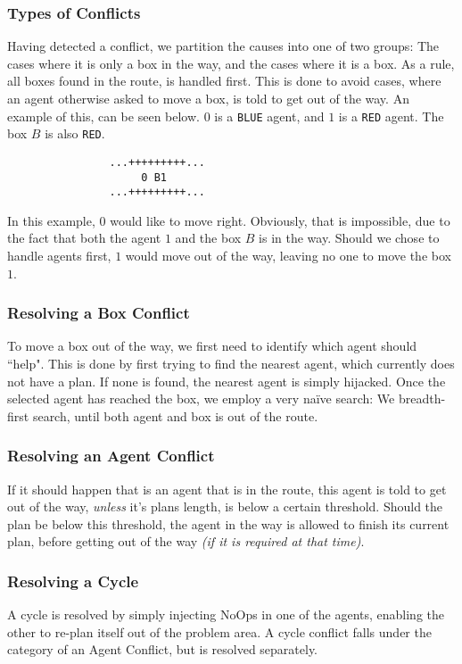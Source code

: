 \documentclass[letterpaper]{article}
\begin{document}
		\subsubsection{Types of Conflicts}
			Having detected a conflict, we partition the causes into one of two groups: The cases where it is only a box in the way, and the cases where it is a box. As a rule, all boxes found in the route, is handled first. This is done to avoid cases, where an agent otherwise asked to move a box, is told to get out of the way. An example of this, can be seen below. $0$ is a \verb=BLUE= agent, and $1$ is a \verb=RED= agent. The box $B$ is also \verb=RED=. 
			\begin{verbatim}
				...+++++++++...
				     0 B1
				...+++++++++...
			\end{verbatim}
			In this example, $0$ would like to move right. Obviously, that is impossible, due to the fact that both the agent $1$ and the box $B$ is in the way. Should we chose to handle agents first, $1$ would move out of the way, leaving no one to move the box $1$.

		\subsubsection{Resolving a Box Conflict}
			To move a box out of the way, we first need to identify which agent should ``help". This is done by first trying to find the nearest agent, which currently does not have a plan. If none is found, the nearest agent is simply hijacked. Once the selected agent has reached the box, we employ a very naïve search: We breadth-first search, until both agent and box is out of the route.

		\subsubsection{Resolving an Agent Conflict}
			If it should happen that is an agent that is in the route, this agent is told to get out of the way, \emph{unless} it's plans length, is below a certain threshold. Should the plan be below this threshold, the agent in the way is allowed to finish its current plan, before getting out of the way \emph{(if it is required at that time)}.

		\subsubsection{Resolving a Cycle}
			A cycle is resolved by simply injecting NoOps in one of the agents, enabling the other to re-plan itself out of the problem area. A cycle conflict falls under the category of an Agent Conflict, but is resolved separately.
		
\end{document}
